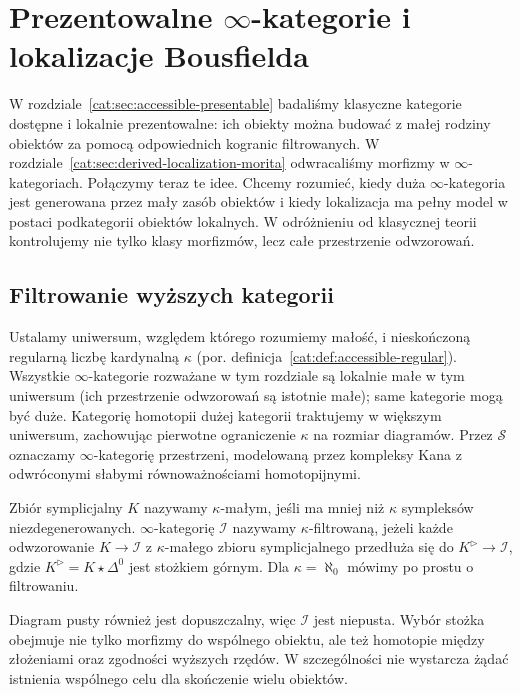 \section{Prezentowalne \texorpdfstring{$\infty$-kategorie}{kategorie wyższe} i lokalizacje Bousfielda}\label{cat:sec:presentable-infty-bousfield}

W rozdziale~\ref{cat:sec:accessible-presentable} badaliśmy klasyczne kategorie dostępne i lokalnie prezentowalne: ich obiekty można budować z małej rodziny obiektów za pomocą odpowiednich kogranic filtrowanych. W rozdziale~\ref{cat:sec:derived-localization-morita} odwracaliśmy morfizmy w $\infty$-kategoriach. Połączymy teraz te idee. Chcemy rozumieć, kiedy duża $\infty$-kategoria jest generowana przez mały zasób obiektów i kiedy lokalizacja ma pełny model w postaci podkategorii obiektów lokalnych. W odróżnieniu od klasycznej teorii kontrolujemy nie tylko klasy morfizmów, lecz całe przestrzenie odwzorowań.

\subsection{Filtrowanie wyższych kategorii}

Ustalamy uniwersum, względem którego rozumiemy małość, i nieskończoną regularną liczbę kardynalną $\kappa$ (por. definicja~\ref{cat:def:accessible-regular}). Wszystkie $\infty$-kategorie rozważane w tym rozdziale są lokalnie małe w tym uniwersum (ich przestrzenie odwzorowań są istotnie małe); same kategorie mogą być duże. Kategorię homotopii dużej kategorii traktujemy w większym uniwersum, zachowując pierwotne ograniczenie $\kappa$ na rozmiar diagramów. Przez $\mathcal S$ oznaczamy $\infty$-kategorię przestrzeni, modelowaną przez kompleksy Kana z odwróconymi słabymi równoważnościami homotopijnymi.

\begin{definicja}\label{cat:def:infty-accessible-filtered}
Zbiór symplicjalny $K$ nazywamy $\kappa$-małym, jeśli ma mniej niż $\kappa$ sympleksów niezdegenerowanych. $\infty$-kategorię $\mathcal I$ nazywamy $\kappa$-filtrowaną, jeżeli każde odwzorowanie $K\to\mathcal I$ z $\kappa$-małego zbioru symplicjalnego przedłuża się do $K^{\triangleright}\to\mathcal I$, gdzie $K^{\triangleright}=K\star\Delta^0$ jest stożkiem górnym. Dla $\kappa=\aleph_0$ mówimy po prostu o filtrowaniu.
\end{definicja}

Diagram pusty również jest dopuszczalny, więc $\mathcal I$ jest niepusta. Wybór stożka obejmuje nie tylko morfizmy do wspólnego obiektu, ale też homotopie między złożeniami oraz zgodności wyższych rzędów. W szczególności nie wystarcza żądać istnienia wspólnego celu dla skończenie wielu obiektów.

